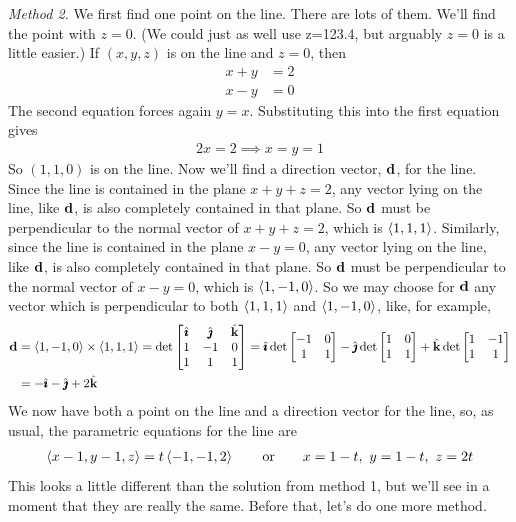 \begin{eg}
\smallskip
\noindent\emph{Method 2.} We first find one point on the line. There
are lots of them. We'll find the point with $z=0$. (We could just as well
use z=123.4, but arguably $z=0$ is a little easier.) If  $(x,y,z)$ is 
on the line and $z=0$, then
\begin{align*}
x+y&=2\\
x-y&=0
\end{align*}
The second equation forces again $y=x$. Substituting this into the first 
equation gives
\begin{align*}
2x=2 \implies x=y=1
\end{align*}
So $(1,1,0)$ is on the line. Now we'll find a direction vector, $\mathbf{d}$,
for the line. Since the line is contained in the plane $x+y+z=2$,
any vector lying on the line, like $\mathbf{d}$, is also completely contained
in that plane. So $\mathbf{d}$ must be perpendicular to the normal vector of
$x+y+z=2$, which is $\left< 1,1,1\right> $. Similarly, since the line is 
contained in the plane $x-y=0$, any vector lying on the line, like $\mathbf{d}$, is also completely contained in that plane.  So $\mathbf{d}$ must be perpendicular to 
the normal vector of $x-y=0$, which is $\left< 1,-1,0\right> $. So we may choose for
$\mathbf{d}$ any vector which is perpendicular to both $\left< 1,1,1\right> $ and 
$\left< 1,-1,0\right>$, like, for example,
\begin{align*}
\mathbf{d}&=\left< 1,-1,0\right> \times\left< 1,1,1\right> 
=\det\left[ \begin{matrix}\hat{\pmb{\imath}} &\hat{\pmb{\jmath}}&\hat{\mathbf{k}}\\ 1&-1&0\\ 1&1&1\end{matrix}\right]
=\hat{\pmb{\imath}}\det\left[\begin{matrix}-1&0\\1&1\end{matrix}\right]
-\hat{\pmb{\jmath}}\det\left[\begin{matrix}1&0\\ 1&1\end{matrix}\right]
+\hat{\mathbf{k}}\det\left[\begin{matrix}1&-1\\ 1&1\end{matrix}\right]\\
&=-\hat{\pmb{\imath}}-\hat{\pmb{\jmath}}+2\hat{\mathbf{k}}
\end{align*}
We now have both a point on the line and a direction vector for the line,
so, as usual, the parametric equations for the line are
\begin{align*}
\left< x-1,y-1,z\right> =t\left< -1,-1,2\right> \qquad\text{or}\qquad
x=1-t,\ y=1-t,\ z=2t
\end{align*}
This looks a little different than the solution from method 1, but we'll see in a moment that they are really the same. Before that, let's do one more method. 


\end{eg}
